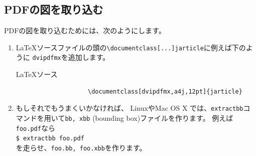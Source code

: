 \documentclass[dvipdfmx,a4j,11pt]{jarticle}
\newenvironment{inputbox}{%
	\begin{itembox}[r]{\LaTeX ソース}
}{
	\end{itembox}
}
\begin{document}
\subsection{PDFの図を取り込む}
	PDFの図を取り込むためには、次のようにします。
	\begin{enumerate}
		\item \LaTeX ソースファイルの頭の{\tt \textbackslash documentclass[...]{jarticle}}に例えば下のように
			\verb"dvipdfmx"を追加します。
			\begin{inputbox}
				\begin{verbatim}
					\documentclass[dvipdfmx,a4j,12pt]{jarticle}
				\end{verbatim}
			\end{inputbox}
		\item もしそれでもうまくいかなければ、
			LinuxやMac OS X では、{\tt extractbb}コマンドを用いて{\tt bb, xbb} (bounding box)ファイルを作ります。
			例えば{\tt foo.pdf}なら\\
			{\tt \$ extractbb foo.pdf}\\
			を走らせ、{\tt foo.bb, foo.xbb}を作ります。
			
	\end{enumerate}
	
\end{document}
